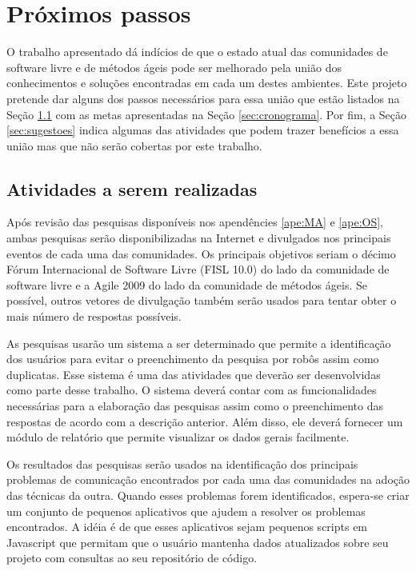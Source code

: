 \chapter{Próximos passos}
\label{cap:perspectivas}

O trabalho apresentado dá indícios de que o estado atual das
comunidades de software livre e de métodos ágeis pode ser melhorado
pela união dos conhecimentos e soluções encontradas em cada um destes
ambientes. Este projeto pretende dar alguns dos passos necessários
para essa união que estão listados na Seção \ref{sec:atividades} com
as metas apresentadas na Seção \ref{sec:cronograma}. Por fim, a Seção
\ref{sec:sugestoes} indica algumas das atividades que podem trazer
benefícios a essa união mas que não serão cobertas por este trabalho.

\section{Atividades a serem realizadas}
\label{sec:atividades}

Após revisão das pesquisas disponíveis nos apendêncies \ref{ape:MA} e
\ref{ape:OS}, ambas pesquisas serão disponibilizadas na Internet e
divulgados nos principais eventos de cada uma das comunidades. Os
principais objetivos seriam o décimo Fórum Internacional de Software
Livre (FISL 10.0) do lado da comunidade de software livre e a Agile
2009 do lado da comunidade de métodos ágeis. Se possível, outros
vetores de divulgação também serão usados para tentar obter o mais
número de respostas possíveis.

As pesquisas usarão um sistema a ser determinado que permite a
identificação dos usuários para evitar o preenchimento da pesquisa por
robôs assim como duplicatas. Esse sistema é uma das atividades que
deverão ser desenvolvidas como parte desse trabalho. O sistema deverá
contar com as funcionalidades necessárias para a elaboração das
pesquisas assim como o preenchimento das respostas de acordo com a
descrição anterior. Além disso, ele deverá fornecer um módulo de
relatório que permite visualizar os dados gerais facilmente.

Os resultados das pesquisas serão usados na identificação dos
principais problemas de comunicação encontrados por cada uma das
comunidades na adoção das técnicas da outra. Quando esses problemas
forem identificados, espera-se criar um conjunto de pequenos
aplicativos que ajudem a resolver os problemas encontrados. A idéia é
de que esses aplicativos sejam pequenos scripts em Javascript que
permitam que o usuário mantenha dados atualizados sobre seu projeto
com consultas ao seu repositório de código.

